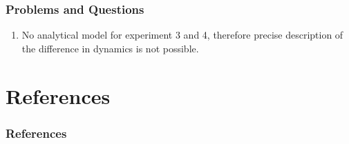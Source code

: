 \documentclass[handout]{beamer}
\begin{document}
\begin{frame}
    \frametitle{Problems and Questions}
    \begin{enumerate}
        \item No analytical model for experiment 3 and 4, therefore precise
        description of the difference in dynamics is not possible.
    \end{enumerate}
\end{frame}

\section{References}

\begin{frame}
    \frametitle{References}
    
    
\end{frame}
\end{document}
